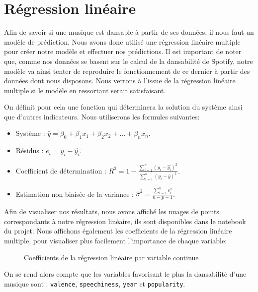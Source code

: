 \documentclass[a4paper, 12pt]{report}
\begin{document}
\section{Régression linéaire}

Afin de savoir si une musique est dansable à partir de ses données, il nous faut un modèle de prédiction. Nous avons donc utilisé une régression linéaire multiple pour créer notre modèle et effectuer nos prédictions. Il est important de noter que, comme nos données se basent sur le calcul de la dansabilité de Spotify, notre modèle va ainsi tenter de reproduire le fonctionnement de ce dernier à partir des données dont nous disposons. Nous verrons à l'issue de la régression linéaire multiple si le modèle en ressortant serait satisfaisant. 

On définit pour cela une fonction qui déterminera la solution du système ainsi que d'autres indicateurs. Nous utiliserons les formules suivantes: 
\begin{itemize}
    \item Système : $\hat{y} = \beta_0 + \beta_1 x_1 + \beta_2 x_2 + ... + \beta_n x_n$.
    \item Résidus : $e_i = y_i - \hat{y_i}$.
    \item Coefficient de détermination : $R^2 = 1 - \frac{\sum_{i=1}^{n} (y_i - \hat{y_i})^2}{\sum_{i=1}^{n} (y_i - \bar{y})^2}$.
    \item Estimation non biaisée de la variance : $\hat{\sigma}^2 = \frac{\sum_{i=1}^{n} e_i^2}{n-p-1}$. 
\end{itemize}

Afin de visualiser nos résultats, nous avons affiché les nuages de points correspondants à notre régression linéaire, ils sont disponibles dans le notebook du projet. Nous affichons également les coefficients de la régression linéaire multiple, pour visualiser plus facilement l'importance de chaque variable:

\begin{figure} [h]
    \centering
    
    \caption{Coefficients de la régression linéaire par variable continue}
    \label{fig:enter-label}
\end{figure}


On se rend alors compte que les variables favorisant le plus la dansabilité d'une musique sont : \verb|valence|, \verb|speechiness|, \verb|year| et \verb|popularity|.
\end{document}
